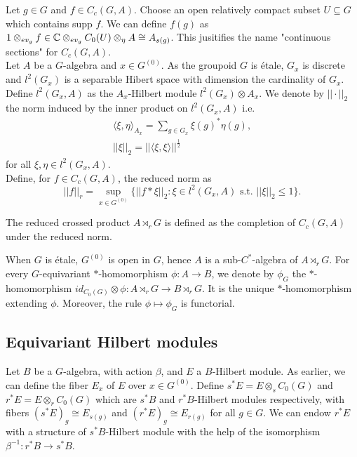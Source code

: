 
Let $g\in G$ and $f\in C_c(G,A)$. Choose an open relatively compact subset $U\subseteq G$ which contains supp $f$. We can define $f(g)$ as $1\otimes_{ev_g} f \in \mathbb C \otimes_{ev_g} C_0(U)\otimes_\eta A\cong A_{s(g)}$. This jusitifies the name "continuous sections" for $C_c(G,A)$. \\

Let $A$ be a $G$-algebra and $x\in G^{(0)}$. As the groupoid $G$ is étale, $G_x$ is discrete and $l^2(G_x)$ is a separable Hibert space with dimension the cardinality of $G_x$. Define $l^2(G_x,A)$ as the $A_x$-Hilbert module $l^2(G_x)\otimes A_x$. We denote by $||\cdot||_2$ the norm induced by the inner product on $l^2(G_x,A)$ i.e. 
\[ \begin{array}{c}
\langle \xi,\eta\rangle_{A_x}= \sum_{g\in G_x} \xi(g)^* \eta(g),\\
||\xi||_2= ||\langle \xi,\xi \rangle||^\frac{1}{2} 
\end{array}\] 
for all $\xi,\eta\in l^2(G_x,A)$.\\

Define, for $f\in C_c(G,A)$, the reduced norm as 
\[||f||_r= \sup_{x\in G^{(0)}}\{ ||f\ast \xi||_2 : \xi\in l^2(G_x,A) \text{ s.t. } ||\xi||_2\leq 1\}.\]


\begin{definition}
The reduced crossed product $A\rtimes_r G$ is defined as the completion of $C_c(G,A)$ under the reduced norm.
\end{definition}

When $G$ is étale, $G^{(0)}$ is open in $G$, hence $A$ is a sub-$C^*$-algebra of $A\rtimes_r G$. For every $G$-equivariant $*$-homomorphism $\phi : A \rightarrow B$, we denote by $\phi_G$ the $*$-homomorphism $id_{C_0(G)}\otimes\phi : A\rtimes_r G \rightarrow B\rtimes_r G $. It is the unique $*$-homomorphism extending $\phi$. Moreover, the rule $\phi \mapsto \phi_G$ is functorial. 


\subsection{Equivariant Hilbert modules}
Let $B$ be a $G$-algebra, with action $\beta$, and $E$ a $B$-Hilbert module. As earlier, we can define the fiber $E_x$ of $E$ over $x\in G^{(0)}$. Define $s^* E = E \otimes_s C_0(G)$ and $r^* E = E \otimes_r C_0(G)$ which are $s^*B$ and $r^*B$-Hilbert modules respectively, with fibers $(s^* E)_g \cong E_{s(g)}$ and $(r^* E)_g \cong E_{r(g)}$ for all $g\in G$. We can endow $r^*E$ with a structure of $s^* B$-Hilbert module with the help of the isomorphism $\beta^{-1} : r^* B\rightarrow s^* B$.

